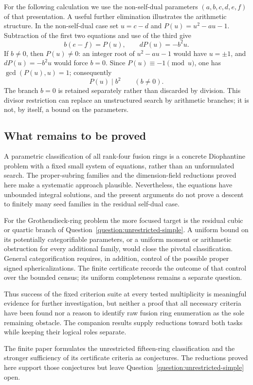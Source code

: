 For the following calculation we use the non-self-dual parameters
$(a,b,c,d,e,f)$ of that presentation. A useful further elimination illustrates the arithmetic structure. In the
non-self-dual case set $u=c-d$ and $P(u)=u^2-au-1$. Subtraction of the
first two equations and use of the third give
\[
 b(e-f)=P(u),\qquad dP(u)=-b^2u.
\]
If $b\ne0$, then $P(u)\ne0$: an integer root of $u^2-au-1$
would have $u=\pm1$, and $dP(u)=-b^2u$ would force $b=0$.
Since $P(u)\equiv-1\pmod u$, one has $\gcd(P(u),u)=1$; consequently
\[
 P(u)\mid b^2\qquad(b\ne0).
\]
The branch $b=0$ is retained separately rather than discarded by division.
This divisor restriction can replace an unstructured search by arithmetic
branches; it is not, by itself, a bound on the parameters.

\subsection{What remains to be proved}
A parametric classification of all rank-four fusion rings is a concrete
Diophantine problem with a fixed small system of equations, rather than
an unformulated search. The proper-subring families and the dimension-field
reductions proved here make a systematic approach plausible. Nevertheless,
the equations have unbounded integral solutions, and the present arguments
do not prove a descent to finitely many seed families in the residual
self-dual case.

For the Grothendieck-ring problem the more focused target is the residual
cubic or quartic branch of Question~\ref{question:unrestricted-simple}.
A uniform bound on its potentially categorifiable parameters, or a uniform
moment or arithmetic obstruction for every additional family, would close
the pivotal classification. General categorification requires, in addition,
control of the possible proper signed sphericalizations. The finite
certificate records the outcome of that control over the bounded
census; its uniform completeness remains a separate question.

Thus success of the fixed criterion suite at every tested multiplicity is
meaningful evidence for further investigation, but neither a proof that
all necessary criteria have been found nor a reason to identify raw fusion
ring enumeration as the sole remaining obstacle. The companion results
supply reductions toward both tasks while keeping their logical roles
separate.

The finite paper formulates the unrestricted fifteen-ring classification
and the stronger sufficiency of its certificate criteria as conjectures.
The reductions proved here support those conjectures but leave
Question~\ref{question:unrestricted-simple} open.
